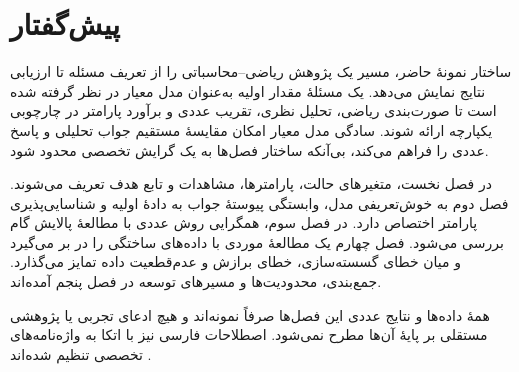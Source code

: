 \chapter*{پیش‌گفتار}
\label{chp_int}

ساختار نمونهٔ حاضر، مسیر یک پژوهش ریاضی--محاسباتی را از تعریف مسئله تا ارزیابی نتایج نمایش می‌دهد. یک مسئلهٔ مقدار اولیه به‌عنوان مدل معیار در نظر گرفته شده است تا صورت‌بندی ریاضی، تحلیل نظری، تقریب عددی و برآورد پارامتر در چارچوبی یکپارچه ارائه شوند. سادگی مدل معیار امکان مقایسهٔ مستقیم جواب تحلیلی و پاسخ عددی را فراهم می‌کند، بی‌آنکه ساختار فصل‌ها به یک گرایش تخصصی محدود شود.

در فصل نخست، متغیرهای حالت، پارامترها، مشاهدات و تابع هدف تعریف می‌شوند. فصل دوم به خوش‌تعریفی مدل، وابستگی پیوستهٔ جواب به دادهٔ اولیه و شناسایی‌پذیری پارامتر اختصاص دارد. در فصل سوم، همگرایی روش عددی با مطالعهٔ پالایش گام بررسی می‌شود. فصل چهارم یک مطالعهٔ موردی با داده‌های ساختگی را در بر می‌گیرد و میان خطای گسسته‌سازی، خطای برازش و عدم‌قطعیت داده تمایز می‌گذارد. جمع‌بندی، محدودیت‌ها و مسیرهای توسعه در فصل پنجم آمده‌اند.

همهٔ داده‌ها و نتایج عددی این فصل‌ها صرفاً نمونه‌اند و هیچ ادعای تجربی یا پژوهشی مستقلی بر پایهٔ آن‌ها مطرح نمی‌شود. اصطلاحات فارسی نیز با اتکا به واژه‌نامه‌های تخصصی تنظیم شده‌اند \cite{ag85}.
